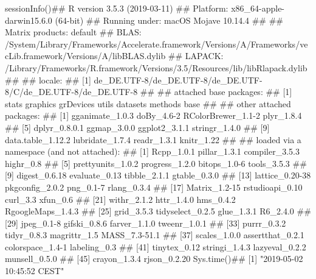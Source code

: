 \documentclass{article}\usepackage[]{graphicx}\usepackage[]{color}
\begin{document}
sessionInfo()## R version 3.5.3 (2019-03-11)
## Platform: x86_64-apple-darwin15.6.0 (64-bit)
## Running under: macOS Mojave 10.14.4
## 
## Matrix products: default
## BLAS: /System/Library/Frameworks/Accelerate.framework/Versions/A/Frameworks/vecLib.framework/Versions/A/libBLAS.dylib
## LAPACK: /Library/Frameworks/R.framework/Versions/3.5/Resources/lib/libRlapack.dylib
## 
## locale:
## [1] de_DE.UTF-8/de_DE.UTF-8/de_DE.UTF-8/C/de_DE.UTF-8/de_DE.UTF-8
## 
## attached base packages:
## [1] stats     graphics  grDevices utils     datasets  methods   base     
## 
## other attached packages:
##  [1] gganimate_1.0.3    doBy_4.6-2         RColorBrewer_1.1-2 plyr_1.8.4        
##  [5] dplyr_0.8.0.1      ggmap_3.0.0        ggplot2_3.1.1      stringr_1.4.0     
##  [9] data.table_1.12.2  lubridate_1.7.4    readr_1.3.1        knitr_1.22        
## 
## loaded via a namespace (and not attached):
##  [1] Rcpp_1.0.1        pillar_1.3.1      compiler_3.5.3    highr_0.8        
##  [5] prettyunits_1.0.2 progress_1.2.0    bitops_1.0-6      tools_3.5.3      
##  [9] digest_0.6.18     evaluate_0.13     tibble_2.1.1      gtable_0.3.0     
## [13] lattice_0.20-38   pkgconfig_2.0.2   png_0.1-7         rlang_0.3.4      
## [17] Matrix_1.2-15     rstudioapi_0.10   curl_3.3          xfun_0.6         
## [21] withr_2.1.2       httr_1.4.0        hms_0.4.2         RgoogleMaps_1.4.3
## [25] grid_3.5.3        tidyselect_0.2.5  glue_1.3.1        R6_2.4.0         
## [29] jpeg_0.1-8        gifski_0.8.6      farver_1.1.0      tweenr_1.0.1     
## [33] purrr_0.3.2       tidyr_0.8.3       magrittr_1.5      MASS_7.3-51.1    
## [37] scales_1.0.0      assertthat_0.2.1  colorspace_1.4-1  labeling_0.3     
## [41] tinytex_0.12      stringi_1.4.3     lazyeval_0.2.2    munsell_0.5.0    
## [45] crayon_1.3.4      rjson_0.2.20
Sys.time()## [1] "2019-05-02 10:45:52 CEST"
\end{document}
